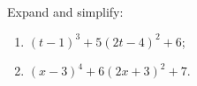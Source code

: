 Expand and simplify:
\begin{enumerate}
\item[(a)] $(t-1)^3+5(2t-4)^2+6$;
\item[(b)] $(x-3)^4+6(2x+3)^2+7$.
\end{enumerate}
